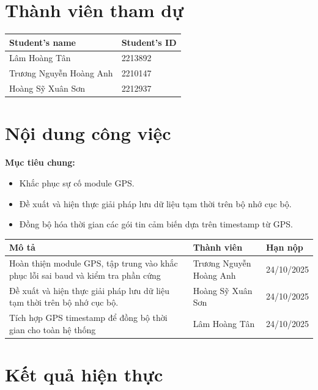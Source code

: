 \section{Thành viên tham dự}
\begin{table}[H]
\centering
\begin{tabular}{|l|l|}
\hline
\textbf{Student’s name} & \textbf{Student’s ID} \\ \hline
Lâm Hoàng Tân           & 2213892                \\ \hline
Trương Nguyễn Hoàng Anh & 2210147                \\ \hline
Hoàng Sỹ Xuân Sơn       & 2212937                \\ \hline
\end{tabular}
\end{table}

\section{Nội dung công việc} 
\textbf{Mục tiêu chung:} 
\begin{itemize} 
\item Khắc phục sự cố module GPS. 
\item Đề xuất và hiện thực giải pháp lưu dữ liệu tạm thời trên bộ nhớ cục bộ.
\item Đồng bộ hóa thời gian các gói tin cảm biến dựa trên timestamp từ GPS. 
\end{itemize}

\begin{table}[H]
\centering
\begin{tabular}{|p{7cm}|p{4cm}|p{3cm}|}
\hline
\textbf{Mô tả} & \textbf{Thành viên} & \textbf{Hạn nộp} \\ 
\hline
Hoàn thiện module GPS, tập trung vào khắc phục lỗi sai baud và kiểm tra phần cứng 
& Trương Nguyễn Hoàng Anh
& 24/10/2025 \\ 
\hline
Đề xuất và hiện thực giải pháp lưu dữ liệu tạm thời trên bộ nhớ cục bộ. 
& Hoàng Sỹ Xuân Sơn
& 24/10/2025 \\ 
\hline
Tích hợp GPS timestamp để đồng bộ thời gian cho toàn hệ thống 
& Lâm Hoàng Tân 
& 24/10/2025 \\ 
\hline
\end{tabular}
\end{table}


\section{Kết quả hiện thực}
